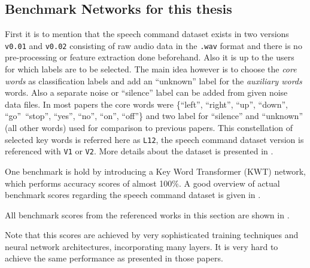 \subsection{Benchmark Networks for this thesis}\label{sec:prev_kws_benchmark}
First it is to mention that the speech command dataset \cite{Warden2018} exists in two versions \texttt{v0.01} and \texttt{v0.02} consisting of raw audio data in the \texttt{.wav} format and there is no pre-processing or feature extraction done beforehand.
Also it is up to the users for which labels are to be selected.
The main idea however is to choose the \emph{core words} as classification labels and add an \enquote{unknown} label for the \emph{auxiliary words} words.
Also a separate noise or \enquote{silence} label can be added from given noise data files.
In most papers the core words were \{\enquote{left},  \enquote{right}, \enquote{up}, \enquote{down}, \enquote{go}\, \enquote{stop}, \enquote{yes}, \enquote{no}, \enquote{on}, \enquote{off}\} and two label for \enquote{silence} and \enquote{unknown} (all other words) used for comparison to previous papers.
This constellation of selected key words is referred here as \texttt{L12}, the speech command dataset version is referenced with \texttt{V1} or \texttt{V2}.
More details about the dataset is presented in .

One benchmark is hold by \cite{Berg2021} introducing a Key Word Transformer (KWT) network, which performs accuracy scores of almost 100\%.
A good overview of actual benchmark scores regarding the speech command dataset is given in \cite{PaperswithcodeKWS}.

All benchmark scores from the referenced works in this section are shown in .

Note that this scores are achieved by very sophisticated training techniques and neural network architectures, incorporating many layers.
It is very hard to achieve the same performance as presented in those papers.

